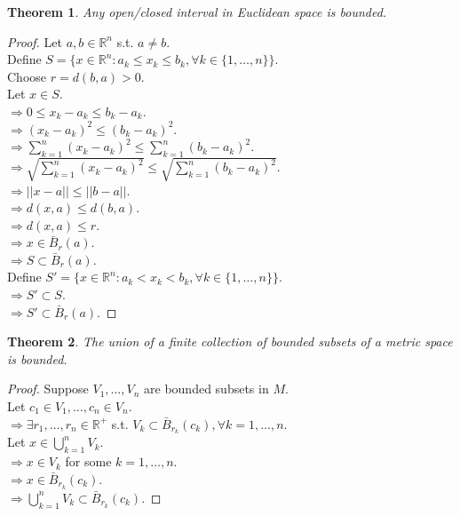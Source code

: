 \documentclass{article}
\newtheorem{theorem}{Theorem}[section]
\begin{document}
			\begin{theorem}
				Any open/closed interval in Euclidean space is bounded.
			\end{theorem}
			\begin{proof} 
				Let $a, b \in \mathbb{R}^n$ s.t. $a \neq b$. \\
				Define $S = \{ x \in \mathbb{R}^n: a_k \leq x_k \leq b_k, \forall k \in \{ 1, \ldots, n \} \}$. \\
				Choose $r = d(b, a) > 0$. \\
				Let $x \in S$. \\
				$\Rightarrow 0 \leq x_k - a_k \leq b_k - a_k$. \\
				$\Rightarrow (x_k - a_k)^2 \leq (b_k - a_k)^2$. \\
				$\Rightarrow \sum \limits_{k=1}^n (x_k - a_k)^2 \leq \sum \limits_{k=1}^n (b_k - a_k)^2$. \\
				$\Rightarrow \sqrt{\sum \limits_{k=1}^n (x_k - a_k)^2} \leq \sqrt{\sum \limits_{k=1}^n (b_k - a_k)^2}$. \\
				$\Rightarrow ||x - a|| \leq ||b - a||$. \\
				$\Rightarrow d(x, a) \leq d(b, a)$. \\
				$\Rightarrow d(x, a) \leq r$. \\
				$\Rightarrow x \in \bar{B}_r(a)$. \\
				$\Rightarrow S \subset \bar{B}_r(a)$. \\

				Define $S' = \{ x \in \mathbb{R}^n: a_k < x_k < b_k, \forall k \in \{ 1, \ldots, n \} \}$. \\
				$\Rightarrow S' \subset S$. \\
				$\Rightarrow S' \subset \bar{B}_r(a)$.
			\end{proof}

			\begin{theorem}
				The union of a finite collection of bounded subsets of a metric space is bounded.
			\end{theorem}
			\begin{proof}
				Suppose $V_1, \ldots, V_n$ are bounded subsets in $M$. \\
				Let $c_1 \in V_1, \ldots, c_n \in V_n$. \\
				$\Rightarrow \exists r_1, \ldots, r_n \in \mathbb{R}^+$ s.t. $V_{k} \subset \bar{B}_{r_k}(c_k), \forall k = 1, \ldots, n$. \\
				Let $x \in \bigcup_{k=1}^{n} V_k$. \\
				$\Rightarrow x \in V_k$ for some $k = 1, \ldots, n$. \\
				$\Rightarrow x \in \bar{B}_{r_k}(c_k)$. \\
				$\Rightarrow \bigcup_{k=1}^{n} V_k \subset  \bar{B}_{r_k}(c_k)$.
			\end{proof}
\end{document}
